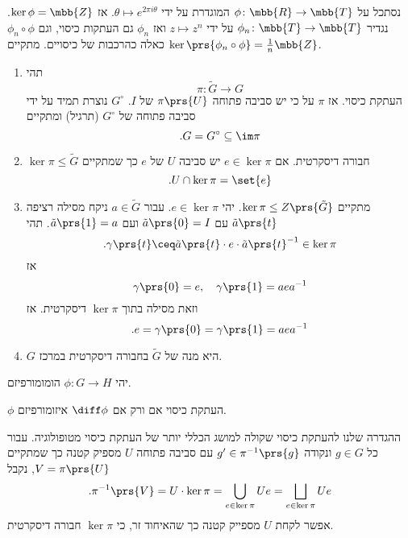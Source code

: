 \documentclass[10pt, twoside]{book}
\newcommand{\textenglish}[1]{\foreignlanguage{english}{#1}}
\begin{document}
\begin{example}
נסתכל על
$\phi \colon \mbb{R} \to \mbb{T}$
המוגדרת על ידי
$\theta \mapsto e^{2 \pi i \theta}$.
אז
$\ker \phi = \mbb{Z}$.
נגדיר
$\phi_n \colon \mbb{T} \to \mbb{T}$
על ידי
$z \mapsto z^n$
ואז
$\phi_n$
גם העתקות כיסוי, וגם
$\phi_n \circ \phi$
כאלה כהרכבות של כיסויים. מתקיים
$\ker \prs{\phi_n \circ \phi} = \frac{1}{n} \mbb{Z}$.
\end{example}

\begin{proposition}
\begin{enumerate}
\item תהי
\[\pi \colon \tilde{G} \to G\]
העתקת כיסוי. אז
$\pi$
על כי יש סביבה פתוחה
$\pi\prs{U}$
של
\textenglish{$I$}.
\textenglish{$G^\circ$}
נוצרת תמיד על ידי סביבה פתוחה של
$G^\circ$ (תרגיל)
ומתקיים
\[\text{.} G = G^\circ \subseteq \im \pi\]

\item
$\ker \pi \leq \tilde{G}$
חבורה דיסקרטית. אם
$e \in \ker \pi$
יש סביבה
$U$
של
$e$
כך שמתקיים
\[\text{.} U \cap \ker \pi = \set{e}\]

\item מתקיים
$\ker \pi \leq Z\prs{\tilde{G}}$.
יהי
$e \in \ker \pi$.
 עבור
 $a \in \tilde{G}$
 ניקח מסילה רציפה
$\tilde{a}\prs{t}$
עם
$\tilde{a}\prs{0} = I$
ועם
$\tilde{a} \prs{1} = a$.
תהי
\[\text{.} \gamma\prs{t} \ceq \tilde{a}\prs{t} \cdot e \cdot \tilde{a}\prs{t}^{-1} \in \ker \pi\]
אז
\[\gamma\prs{0} = e, \quad \gamma\prs{1} = aea^{-1}\]
וזאת מסילה בתוך
$\ker \pi$
דיסקרטית.
אז
\[\text{.} e = \gamma\prs{0} = \gamma\prs{1} = aea^{-1}\]

\item $G$
היא מנה של
$\tilde{G}$
בחבורה דיסקרטית במרכז.
\end{enumerate}
\end{proposition}

\begin{lemma}
יהי
$\phi \colon G \to H$
הומומורפיזם.

$\phi$
העתקת כיסוי אם ורק אם
$\diff \phi$
איזומורפיזם.
\end{lemma}

\begin{remark}
ההגדרה שלנו להעתקת כיסוי שקולה למושג הכללי יותר של העתקת כיסוי מטופולוגיה.
עבור כל
$g \in G$
ונקודה
$g' \in \pi^{-1}\prs{g}$
עם סביבה פתוחה
$U$
מספיק קטנה
כך שמתקיים
$V = \pi\prs{U}$,
נקבל
\[\text{.} \pi^{-1}\prs{V} = U \cdot \ker \pi = \bigcup_{e \in \ker \pi} U e = \bigsqcup_{e \in \ker \pi} U e\]
אפשר לקחת
$U$
מספייק קטנה כך שהאיחוד זר, כי
$\ker \pi$
חבורה דיסקרטית.
\end{remark}
\end{document}
